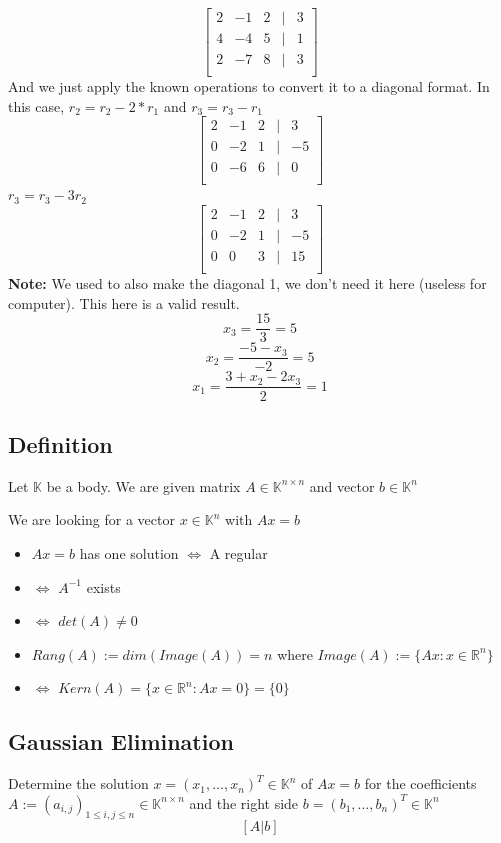 \documentclass{article}
\begin{document}
\[
\begin{bmatrix}
  2 & -1 &2& |& 3\\
  4 & -4 &5& |& 1\\
  2 & -7 &8& |& 3\\
\end{bmatrix}
\]
And we just apply the known operations to convert it to a diagonal format. In this case, $r_2 = r_2 - 2*r_1$ and $r_3 = r_3 - r_1$
\[
\begin{bmatrix}
  2 & -1 &2& |& 3\\
  0 & -2 &1& |& -5\\
  0 & -6 &6& |& 0\\
\end{bmatrix}
\]
$r_3 = r_3 - 3r_2$
\[
\begin{bmatrix}
  2 & -1 &2& |& 3\\
  0 & -2 &1& |& -5\\
  0 & 0 &3& |& 15\\
\end{bmatrix}
\]
\textbf{Note:} We used to also make the diagonal 1, we don't need it here (useless for computer). This here is a 
valid result.
\[x_3 = \frac{15}{3} = 5\]
\[x_2 = \frac{-5 -x_3}{-2} = 5\]
\[x_1 = \frac{3+x_2-2x_3}{2} = 1\]

\subsection{Definition}
Let $\mathbb{K}$ be a body. We are given matrix $A \in \mathbb{K}^{n\times n}$ and vector $b \in \mathbb{K}^n$

We are looking for a vector $x\in \mathbb{K}^n$ with $Ax = b$

\begin{itemize}
  \item $Ax = b$ has one solution $\Leftrightarrow$ A regular
  \item $\Leftrightarrow$ $A^{-1}$ exists
  \item $\Leftrightarrow$ $det(A) \neq 0$
  \item $Rang(A) := dim(Image(A)) = n$ where
  $Image(A) := \{Ax : x \in \mathbb{R}^n\}$
  \item $\Leftrightarrow$ $Kern(A) = \{x\in \mathbb{R}^n : Ax = 0\} = \{0\}$
\end{itemize}
\subsection{Gaussian Elimination}
Determine the solution $x = (x_1,\dots,x_n)^T \in \mathbb{K}^n$ of $Ax = b$
for the coefficients $A := (a_{i,j})_{1\leq i,j \leq n} \in \mathbb{K}^{n\times n}$ and the right side $b = (b_1,\dots,b_n)^T\in\mathbb{K}^n$
\[[A|b]\]
\end{document}
